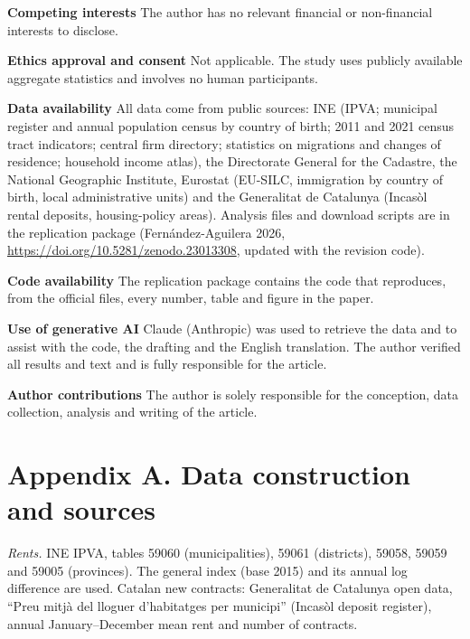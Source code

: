 \documentclass[11pt,a4paper]{article}
\begin{document}
\medskip\noindent\textbf{Competing interests} The author has no relevant financial or non-financial interests to disclose.

\medskip\noindent\textbf{Ethics approval and consent} Not applicable. The study uses publicly available aggregate statistics and involves no human participants.

\medskip\noindent\textbf{Data availability} All data come from public sources: INE (IPVA; municipal register and annual population census by country of birth; 2011 and 2021 census tract indicators; central firm directory; statistics on migrations and changes of residence; household income atlas), the Directorate General for the Cadastre, the National Geographic Institute, Eurostat (EU-SILC, immigration by country of birth, local administrative units) and the Generalitat de Catalunya (Incasòl rental deposits, housing-policy areas). Analysis files and download scripts are in the replication package (Fernández-Aguilera 2026, \url{https://doi.org/10.5281/zenodo.23013308}, updated with the revision code).

\medskip\noindent\textbf{Code availability} The replication package contains the code that reproduces, from the official files, every number, table and figure in the paper.

\medskip\noindent\textbf{Use of generative AI} Claude (Anthropic) was used to retrieve the data and to assist with the code, the drafting and the English translation. The author verified all results and text and is fully responsible for the article.

\medskip\noindent\textbf{Author contributions} The author is solely responsible for the conception, data collection, analysis and writing of the article.



\clearpage
\appendix
\section*{Appendix A. Data construction and sources}

\textit{Rents.} INE IPVA, tables 59060 (municipalities), 59061 (districts), 59058, 59059 and 59005 (provinces). The general index (base 2015) and its annual log difference are used. Catalan new contracts: Generalitat de Catalunya open data, ``Preu mitjà del lloguer d'habitatges per municipi'' (Incasòl deposit register), annual January--December mean rent and number of contracts.
\end{document}
